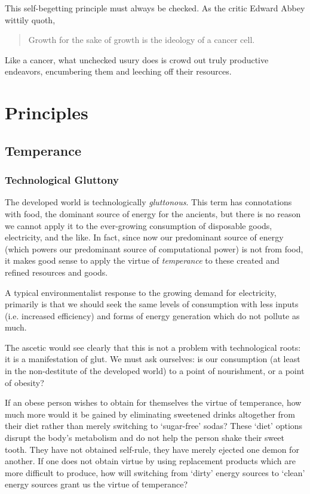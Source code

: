 \documentclass[letterpaper]{article}
\begin{document}
This self-begetting principle must always be checked. As the critic Edward Abbey wittily quoth,

\begin{quote}
  Growth for the sake of growth is the ideology of a cancer cell.
\end{quote}

Like a cancer, what unchecked usury does is crowd out truly productive endeavors, encumbering them and leeching off their resources.

\section{Principles}


\subsection{Temperance}

\subsubsection{Technological Gluttony}

The developed world is technologically \textit{gluttonous}. This term has connotations with food, the dominant source of energy for the ancients, but there is no reason we cannot apply it to the ever-growing consumption of disposable goods, electricity, and the like. In fact, since now our predominant source of energy (which powers our predominant source of computational power) is not from food, it makes good sense to apply the virtue of \textit{temperance} to these created and refined resources and goods.

A typical environmentalist response to the growing demand for electricity, primarily is that we should seek the same levels of consumption with less inputs (i.e. increased efficiency) and forms of energy generation which do not pollute as much.

The ascetic would see clearly that this is not a problem with technological roots: it is a manifestation of glut. We must ask ourselves: is our consumption (at least in the non-destitute of the developed world) to a point of nourishment, or a point of obesity?

If an obese person wishes to obtain for themselves the virtue of temperance, how much more would it be gained by eliminating sweetened drinks altogether from their diet rather than merely switching to `sugar-free' sodas? These `diet' options disrupt the body's metabolism and do not help the person shake their sweet tooth. They have not obtained self-rule, they have merely ejected one demon for another. If one does not obtain virtue by using replacement products which are more difficult to produce, how will switching from `dirty' energy sources to `clean' energy sources grant us the virtue of temperance?
\end{document}
